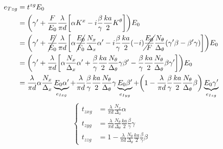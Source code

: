 \begin{align*}
    e_{\T zg} &= t^{zg} E_0
    \\
    &=
    \left(
        \gamma' +
        \frac{F}{E_0}
        \frac{\lambda}{\pi d}
        \left[
            \alpha K^x - i \frac{\beta}{\gamma} \frac{ka}{2} K^\theta
        \right]
    \right)
    E_0
    \\
    &=
    \left(
        \gamma' +
        \cancel{\frac{F}{E_0}}
        \frac{\lambda}{\pi d}
        \left[
            \alpha
            \cancel{\frac{E_0}{F_0}}
            \frac{N_x}{\Delta_x}
            \alpha'
            -
            i
            \frac{\beta}{\gamma}
            \frac{ka}{2}
            (-i)
            \cancel{\frac{E_0}{F}}
            \frac{N_\theta}{\Delta_\theta}
            (\gamma' \beta - \beta' \gamma)
        \right]
    \right)
    E_0
    \\
    &=
    \left(
        \gamma' +
        \frac{\lambda}{\pi d}
        \left[
            \alpha
            \frac{N_x}{\Delta_x}
            \alpha'
            +
            \frac{\beta}{\gamma}
            \frac{ka}{2}
            \frac{N_\theta}{\Delta_\theta}
            \gamma
            \beta'
            -
            \frac{\beta}{\gamma}
            \frac{ka}{2}
            \frac{N_\theta}{\Delta_\theta}
            \beta
            \gamma'
        \right]
    \right)
    E_0
    \\
    &=
    \frac{\lambda}{\pi d}
    \alpha
    \frac{N_x}{\Delta_x}
    \underbrace{E_0 \alpha'}_{e_{\I xg}}
    +
    \frac{\lambda}{\pi d}
    \frac{\beta}{\gamma}
    \frac{ka}{2}
    \frac{N_\theta}{\Delta_\theta}
    \gamma
    \underbrace{E_0 \beta'}_{e_{\I yg}}
    +
    \left(
        1
        -
        \frac{\lambda}{\pi d}
        \frac{\beta}{\gamma}
        \frac{ka}{2}
        \frac{N_\theta}{\Delta_\theta}
        \beta
    \right)
    \underbrace{E_0 \gamma'}_{e_{\I zg}}
\end{align*}
\begin{equation}
    \left\lbrace
    \begin{aligned}
        t_{zxg}
        &= \frac{\lambda}{\pi d}
           \frac{N_x}{\Delta_x}
           \alpha
        \\
        t_{zyg}
        &= \frac{\lambda}{\pi d}
           \frac{N_\theta}{\Delta_\theta}
           \frac{ka}{2}
           \frac{\beta}{\gamma}
           \gamma
        \\
        t_{zzg}
        &= 1
           -
           \frac{\lambda}{\pi d}
           \frac{N_\theta}{\Delta_\theta}
           \frac{ka}{2}
           \frac{\beta}{\gamma}
           \beta
    \end{aligned}
    \right.
\end{equation}

